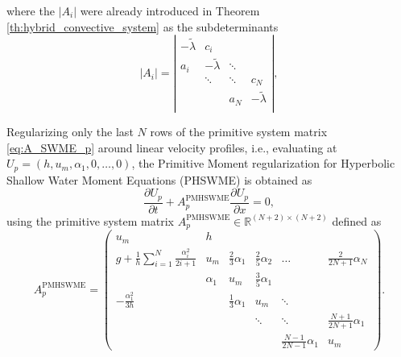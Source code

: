 \documentclass[10pt,a4paper]{amsart}
\begin{document}
    where the $|A_i|$ were already introduced in Theorem \ref{th:hybrid_convective_system} as the subdeterminants     \begin{equation}\label{eq:subdeterminant}
       |A_i| = \left|
        \begin{array}{cccc}
           -\widetilde{\lambda} & c_i  &  &   \\
          a_i & -\widetilde{\lambda} & \ddots  &   \\
       & \ddots & \ddots & c_N \\
         &  & a_N & -\widetilde{\lambda}   \\
        \end{array}
        \right|,
    \end{equation}

\begin{theorem}\label{th:APMHSWME_p}
    Regularizing only the last $N$ rows of the primitive system matrix \eqref{eq:A_SWME_p} around linear velocity profiles, i.e., evaluating at $U_{p}=\left(h,u_m,\alpha_1, 0, \ldots, 0\right)$, the Primitive Moment regularization for Hyperbolic Shallow Water Moment Equations (PHSWME) is obtained as
    \begin{equation}\label{eq:PMHSWME_p}
        \frac{\partial U_{p}}{\partial t} + A^{\textrm{PMHSWME}}_{p} \frac{\partial U_{p}}{\partial x} = 0,
    \end{equation}
    using the primitive system matrix $A^{\textrm{PMHSWME}}_{p} \in \mathbb{R}^{(N+2)\times(N+2)}$ defined as
    \begin{equation}\label{eq:A_PMHSWME_p}
        A^{\textrm{PMHSWME}}_{p} =
        \left(\begin{array}{cccccc}
        u_m & h &  &  &  &  \\
        g + \frac{1}{h} \sum\limits_{i=1}^N \frac{\alpha_i^2}{2i+1} & u_m & \frac{2}{3} \alpha_1 & \frac{2}{5} \alpha_2 & \dots & \frac{2}{2N+1} \alpha_N \\
         & \alpha_1 & u_m & \frac{3}{5} \alpha_1 & &\\
        -\frac{\alpha_1^2}{3h} &   & \frac{1}{3}\alpha_1 & u_m & \ddots & \\
         &  &  & \ddots & \ddots & \frac{N+1}{2N+1}\alpha_1 \\
         &  &  &  & \frac{N-1}{2N-1}\alpha_1 & u_m
        \end{array}\right).
    \end{equation}
\end{theorem}
\end{document}
